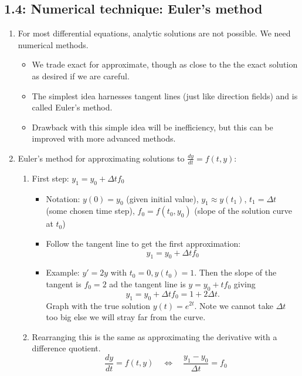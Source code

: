 \documentclass{article}
\newcommand{\ds}{\displaystyle}
\begin{document}
\subsection{1.4: Numerical technique: Euler's method}

\begin{enumerate}

\item For most differential equations, analytic solutions are not possible. We need numerical methods. 
\begin{itemize}
\item We trade exact for approximate, though as close to the the exact solution as desired if we are careful.
\item The simplest idea harnesses tangent lines (just like direction fields) and is called Euler's method.
\item Drawback with this simple idea will be inefficiency, but this can be improved with more advanced methods.
\end{itemize}


\item Euler's method for approximating solutions to $\ds \frac{dy}{dt} = f(t,y)$:
\begin{enumerate}
\item First step: $y_1 = y_0 + \Delta t f_0$
\begin{itemize}
\item Notation: $y(0)=y_0$ (given initial value), $y_1 \approx y(t_1)$, $t_1 = \Delta t$ (some chosen time step), $f_0=f(t_0, y_0)$ (slope of the solution curve at $t_0$)
\item Follow the tangent line to get the first approximation:
\[
y_1 = y_0 + \Delta t f_0
\]
\item Example: $y'=2y$ with $t_0=0, y(t_0)=1$. Then the slope of the tangent is $f_0=2$ ad the tangent line is $y=y_0+tf_0$ giving 
\[
y_1=y_0+\Delta t f_0=1+2\Delta t.
\]
Graph with the true solution $y(t)=e^{2t}$. Note we cannot take $\Delta t$ too big else we will stray far from the curve. 
\end{itemize}

\item Rearranging this is the same as approximating the derivative with a difference quotient.
\[
\frac{dy}{dt} = f(t,y) \quad \Leftrightarrow \quad \frac{y_1-y_0}{\Delta t} = f_0
\]


\end{enumerate}
\end{enumerate}
\end{document}
